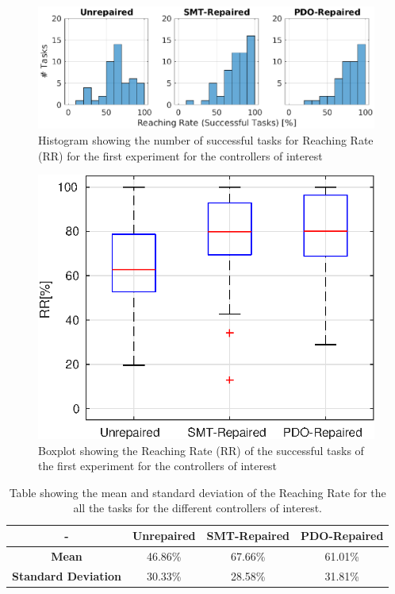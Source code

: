 \begin{figure}[ht]
    \centering
    \includegraphics[width=\textwidth]{Images/first-experiment/exp0_RR_succ_hist.eps}
    \caption{Histogram showing the number of successful tasks for Reaching Rate (RR) for the first experiment for the controllers of interest}
    \label{fig:hist-RR-succ-first}
\end{figure}
\begin{figure}[ht]
    \centering
    \includegraphics[width=\textwidth]{Images/first-experiment/exp0_RR_succ_box.eps}
    \caption{Boxplot showing the Reaching Rate (RR) of the successful tasks of the first experiment for the controllers of interest}
    \label{fig:box-RR-succ-first}
\end{figure}
%
%
\begin{table}[ht]
    \centering
    \begin{tabular}{|c|c|c|c|}
        \hline
        - & \textbf{Unrepaired} & \textbf{SMT-Repaired} & \textbf{PDO-Repaired} \\
        \hline
        \textbf{Mean} & 46.86\% & 67.66\% & 61.01\% \\
        \textbf{Standard Deviation} & 30.33\% & 28.58\% & 31.81\% \\
        \hline
    \end{tabular}
    \caption{Table showing the mean and standard deviation of the Reaching Rate for the all the tasks for the different controllers of interest.}
    \label{tab:RR-all-first-mean-std}
\end{table}
